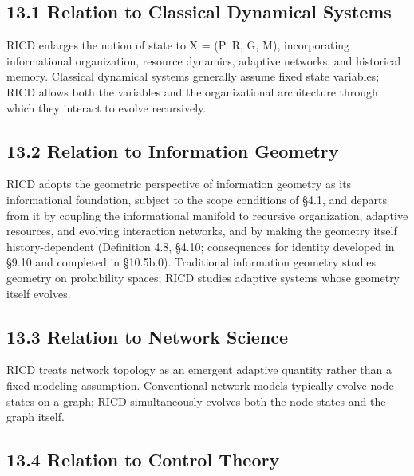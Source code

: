 \documentclass[
]{article}
\begin{document}
\hypertarget{relation-to-classical-dynamical-systems}{%
\subsection{13.1 Relation to Classical Dynamical
Systems}\label{relation-to-classical-dynamical-systems}}

RICD enlarges the notion of state to X = (P, R, G, M), incorporating
informational organization, resource dynamics, adaptive networks, and
historical memory. Classical dynamical systems generally assume fixed
state variables; RICD allows both the variables and the organizational
architecture through which they interact to evolve recursively.

\hypertarget{relation-to-information-geometry}{%
\subsection{13.2 Relation to Information
Geometry}\label{relation-to-information-geometry}}

RICD adopts the geometric perspective of information geometry as its
informational foundation, subject to the scope conditions of §4.1, and
departs from it by coupling the informational manifold to recursive
organization, adaptive resources, and evolving interaction networks, and
by making the geometry itself history-dependent (Definition 4.8, §4.10;
consequences for identity developed in §9.10 and completed in §10.5b.0).
Traditional information geometry studies geometry on probability spaces;
RICD studies adaptive systems whose geometry itself evolves.

\hypertarget{relation-to-network-science}{%
\subsection{13.3 Relation to Network
Science}\label{relation-to-network-science}}

RICD treats network topology as an emergent adaptive quantity rather
than a fixed modeling assumption. Conventional network models typically
evolve node states on a graph; RICD simultaneously evolves both the node
states and the graph itself.

\hypertarget{relation-to-control-theory}{%
\subsection{13.4 Relation to Control
Theory}\label{relation-to-control-theory}}
\end{document}
